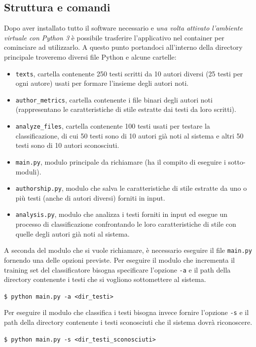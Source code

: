 \documentclass[titlepage]{article}
\begin{document}
\subsection{Struttura e comandi}
Dopo aver installato tutto il software necessario e \emph{una volta attivato l'ambiente virtuale con Python 3} è possibile trasferire l'applicativo nel container per cominciare ad utilizzarlo. A questo punto portandoci all'interno della directory principale troveremo diversi file Python e alcune cartelle:
\begin{itemize}
    \item \texttt{texts}, cartella contenente 250 testi scritti da 10 autori diversi (25 testi per ogni autore) usati per formare l'insieme degli autori noti.
    \item \texttt{author\_metrics}, cartella contenente i file binari degli autori noti (rappresentano le caratteristiche di stile estratte dai testi da loro scritti).
    \item \texttt{analyze\_files}, cartella contenente 100 testi usati per testare la classificazione, di cui 50 testi sono di 10 autori già noti al sistema e altri 50 testi sono di 10 autori sconosciuti.
    \item \texttt{main.py}, modulo principale da richiamare (ha il compito di eseguire i sotto-moduli).
    \item \texttt{authorship.py}, modulo che salva le caratteristiche di stile estratte da uno o più testi (anche di autori diversi) forniti in input.
    \item \texttt{analysis.py}, modulo che analizza i testi forniti in input ed esegue un processo di classificazione confrontando le loro caratteristiche di stile con quelle degli autori già noti al sistema.
\end{itemize}
A seconda del modulo che si vuole richiamare, è necessario eseguire il file \texttt{main.py} fornendo una delle opzioni previste. Per eseguire il modulo che incrementa il training set del classificatore bisogna specificare l'opzione \texttt{-a} e il path della directory contenente i testi che si vogliono sottomettere al sistema.
\bigskip

\texttt{\$ python main.py -a <dir\_testi>}
\bigskip

\noindent
Per eseguire il modulo che classifica i testi bisogna invece fornire l'opzione \texttt{-s} e il path della directory contenente i testi sconosciuti che il sistema dovrà riconoscere.
\bigskip

\texttt{\$ python main.py -s <dir\_testi\_sconosciuti>}
\bigskip
\end{document}

